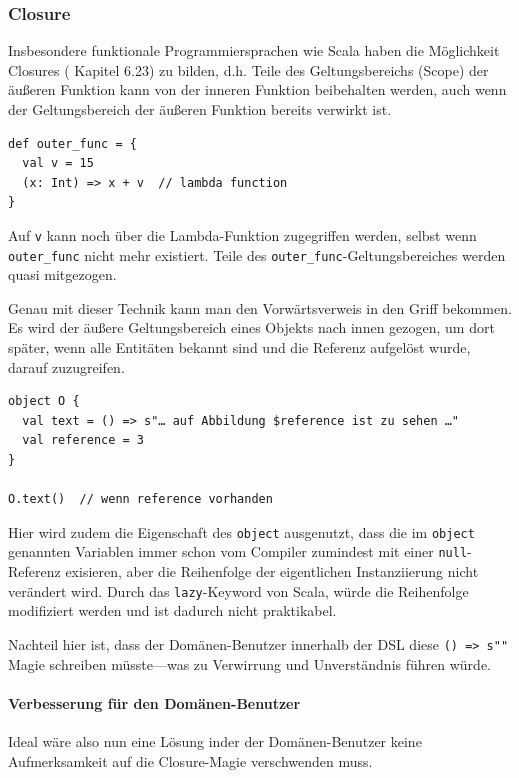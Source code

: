 \subsubsection{Closure}\label{sec-closure}

Insbesondere funktionale Programmiersprachen wie Scala haben die
Möglichkeit Closures (\cite{scala-ref} Kapitel 6.23) zu bilden,
d.h. Teile des Geltungsbereichs (Scope)
der äußeren Funktion kann von der inneren Funktion beibehalten werden,
auch wenn der Geltungsbereich der äußeren Funktion bereits verwirkt ist.

\begin{lstlisting}
def outer_func = {
  val v = 15
  (x: Int) => x + v  // lambda function
}
\end{lstlisting}

Auf \verb|v| kann noch über die Lambda-Funktion zugegriffen werden,
selbst wenn \verb|outer_func| nicht mehr existiert. Teile des
\verb|outer_func|-Geltungsbereiches werden quasi mitgezogen.

Genau mit dieser Technik kann man den Vorwärtsverweis in den Griff bekommen.
Es wird der äußere Geltungsbereich eines Objekts nach innen gezogen,
um dort später, wenn alle Entitäten bekannt sind und die Referenz aufgelöst
wurde, darauf zuzugreifen.

\begin{lstlisting}
object O {
  val text = () => s"… auf Abbildung $reference ist zu sehen …"
  val reference = 3
}

O.text()  // wenn reference vorhanden
\end{lstlisting}

Hier wird zudem die Eigenschaft des \verb|object| ausgenutzt,
dass die im \verb|object| genannten Variablen immer schon vom Compiler
zumindest mit einer \verb|null|-Referenz exisieren, aber die Reihenfolge
der eigentlichen Instanziierung nicht verändert wird. Durch das
\verb|lazy|-Keyword von Scala, würde die Reihenfolge modifiziert werden
und ist dadurch nicht praktikabel.

Nachteil hier ist, dass der Domänen-Benutzer innerhalb der DSL diese
\verb|() => s""| Magie schreiben müsste---was zu Verwirrung und
Unverständnis führen würde.


\paragraph{Verbesserung für den Domänen-Benutzer}

Ideal wäre also nun eine Lösung inder der Domänen-Benutzer keine
Aufmerksamkeit auf die Closure-Magie verschwenden muss.

